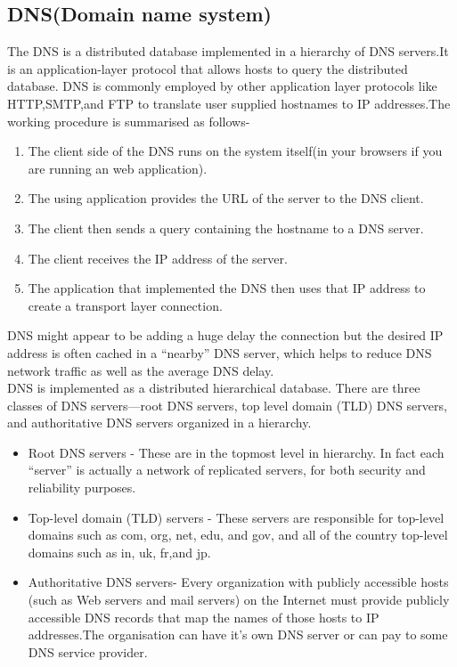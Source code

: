 \documentclass{article}
\begin{document}
\subsection{DNS(Domain name system)}
The DNS is a distributed database implemented in a hierarchy of DNS servers.It is an application-layer protocol that allows hosts to query the distributed database.
DNS is commonly employed by other application layer protocols like HTTP,SMTP,and FTP to translate user supplied hostnames to IP addresses.The working procedure is summarised as follows-
\begin{enumerate}
    \item The client side of the DNS runs on the system itself(in your browsers if you are running an web application).
    \item The using application provides the URL of the server to the DNS client.
    \item The client then sends a query containing the hostname to a DNS server.
    \item The client receives the IP address of the server.
    \item The application that implemented the DNS then uses that IP address to create a transport layer connection.
\end{enumerate}
DNS might appear to be adding a huge delay the connection but the desired IP address is often cached in a “nearby” DNS server, which helps to reduce DNS network traffic as well as the average DNS delay.\\
DNS is implemented as a distributed hierarchical database. There are three classes of DNS servers—root DNS servers, top level domain (TLD) DNS servers, and authoritative DNS servers organized in a hierarchy.
\begin{itemize}
    \item Root DNS servers - These are in the topmost level in hierarchy. In fact each “server” is actually a network of replicated servers, for both security and reliability purposes.
    \item Top-level domain (TLD) servers - These servers are responsible for top-level domains such as com, org, net, edu, and gov, and all of the country top-level domains such as in, uk, fr,and jp.
    \item Authoritative DNS servers- Every organization with publicly accessible hosts (such as Web servers and mail servers) on the Internet must provide publicly accessible DNS records that map the names of those hosts to IP addresses.The organisation can have it's own DNS server or can pay to some DNS service provider.
\end{itemize}
\end{document}
